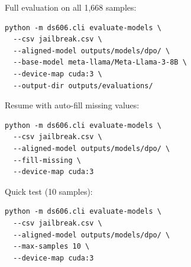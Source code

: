 \documentclass[11pt,a4paper]{article}
\begin{document}
Full evaluation on all 1,668 samples:
\begin{verbatim}
python -m ds606.cli evaluate-models \
  --csv jailbreak.csv \
  --aligned-model outputs/models/dpo/ \
  --base-model meta-llama/Meta-Llama-3-8B \
  --device-map cuda:3 \
  --output-dir outputs/evaluations/
\end{verbatim}

Resume with auto-fill missing values:
\begin{verbatim}
python -m ds606.cli evaluate-models \
  --csv jailbreak.csv \
  --aligned-model outputs/models/dpo/ \
  --fill-missing \
  --device-map cuda:3
\end{verbatim}

Quick test (10 samples):
\begin{verbatim}
python -m ds606.cli evaluate-models \
  --csv jailbreak.csv \
  --aligned-model outputs/models/dpo/ \
  --max-samples 10 \
  --device-map cuda:3
\end{verbatim}
\end{document}
